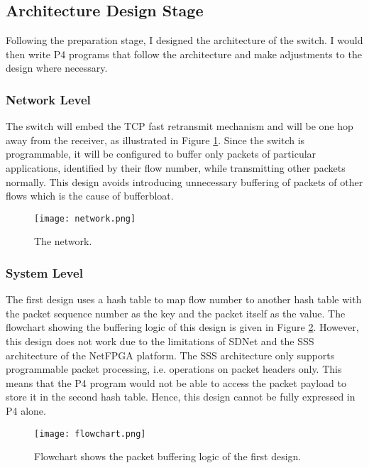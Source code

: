 	\subsection{Architecture Design Stage}
	\label{sec:arch-design}
	Following the preparation stage, I designed the architecture of the switch. I would then write P4 programs that follow the architecture and make adjustments to the design where necessary.
		
	\subsubsection{Network Level}
	The switch will embed the TCP fast retransmit mechanism and will be one hop away from the receiver, as illustrated in Figure \ref{fig:network}. Since the switch is programmable, it will be configured to buffer only packets of particular applications, identified by their flow number, while transmitting other packets normally. This design avoids introducing unnecessary buffering of packets of other flows which is the cause of bufferbloat.
	\begin{figure}[!hb]
		\centering
		\texttt{[image: network.png]}
		\caption{The network.}
		\label{fig:network}
	\end{figure}

	\subsubsection{System Level}
	The first design uses a hash table to map flow number to another hash table with the packet sequence number as the key and the packet itself as the value. The flowchart showing the buffering logic of this design is given in Figure \ref{fig:flowchart}. However, this design does not work due to the limitations of SDNet and the SSS architecture of the NetFPGA platform. The SSS architecture only supports programmable packet processing, i.e. operations on packet headers only. This means that the P4 program would not be able to access the packet payload to store it in the second hash table. Hence, this design cannot be fully expressed in P4 alone.
	
	\begin{landscape}
		\begin{figure}[!ht]
			\centering
			\texttt{[image: flowchart.png]}
			\caption{Flowchart shows the packet buffering logic of the first design.}
			\label{fig:flowchart}
		\end{figure}
	\end{landscape}
	
